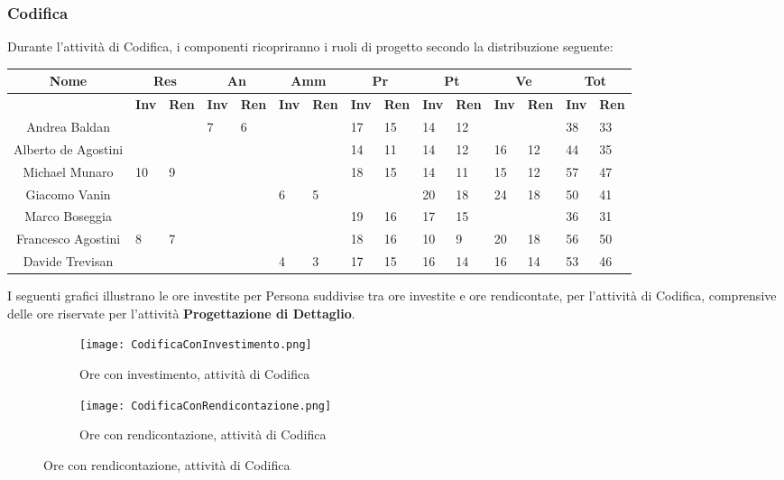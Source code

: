 \documentclass{scalatekids-article}
\begin{document}
\subsubsection{Codifica}
Durante l'attività di Codifica, i componenti ricopriranno i ruoli di progetto secondo la distribuzione seguente:
\begin{center}
  \scriptsize
  \begin{tabular}{| c | p{0.35cm}  p{0.35cm} | p{0.35cm}  p{0.35cm} | p{0.35cm}  p{0.35cm} | p{0.35cm}  p{0.35cm} | p{0.35cm}  p{0.35cm} | p{0.35cm}  p{0.35cm} | p{0.35cm}  p{0.35cm} |}
    \hline
    \textbf{Nome} & \multicolumn{2}{|c|}{\textbf{Res}} & \multicolumn{2}{|c|}{\textbf{An}} & \multicolumn{2}{|c|}{\textbf{Amm}} & \multicolumn{2}{|c|}{\textbf{Pr}} & \multicolumn{2}{|c|}{\textbf{Pt}} & \multicolumn{2}{|c|}{\textbf{Ve}} & \multicolumn{2}{|c|}{\textbf{Tot}}\\
    \hline
    & \textbf{Inv} & \textbf{Ren} & \textbf{Inv} & \textbf{Ren} & \textbf{Inv} & \textbf{Ren} & \textbf{Inv} & \textbf{Ren} & \textbf{Inv} & \textbf{Ren} & \textbf{Inv} & \textbf{Ren} & \textbf{Inv} & \textbf{Ren}\\
    \hline
    Andrea Baldan & & & 7 & 6 & & & 17 & 15 & 14 & 12 & & & 38 & 33\\
    Alberto de Agostini & & & & & & & 14 & 11 & 14 & 12 & 16 & 12 & 44 & 35\\
    Michael Munaro & 10 & 9 & & & & & 18 & 15 & 14 & 11 & 15 & 12 & 57 & 47\\
    Giacomo Vanin & & & & & 6 & 5 & & & 20 & 18 & 24 & 18 & 50 & 41\\
    Marco Boseggia & & & & & & & 19 & 16 & 17 & 15 & & & 36 & 31\\
    Francesco Agostini & 8 & 7 & & & & & 18 & 16 & 10 & 9 & 20 & 18 & 56 & 50\\
    Davide Trevisan & & & & & 4 & 3 & 17 & 15 & 16 & 14 & 16 & 14 & 53 & 46\\
    \hline
  \end{tabular}
\end{center}
\normalsize I seguenti grafici illustrano le ore investite per Persona suddivise
tra ore investite e ore rendicontate, per l'attività di Codifica, comprensive
delle ore riservate per l'attività \textbf{Progettazione di Dettaglio}.
\begin{figure}[H]
  \begin{subfigure}[H]{0.47\textwidth}
    \texttt{[image: CodificaConInvestimento.png]}
    \caption{Ore con investimento, attività di Codifica}
  \end{subfigure}
  \qquad
  \begin{subfigure}[H]{0.47\textwidth}
    \texttt{[image: CodificaConRendicontazione.png]}
    \caption{Ore con rendicontazione, attività di Codifica}
  \end{subfigure}
\end{figure}
\end{document}
